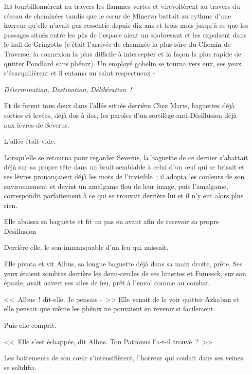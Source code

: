 
\lettrine{I}{ls} tourbillonnèrent au travers les flammes vertes et virevoltèrent au travers du réseau de cheminées tandis que le cœur de Minerva battait au rythme d'une horreur qu'elle n'avait pas ressentie depuis dix ans et trois mois jusqu'à ce que les passages situés entre les plis de l'espace aient un soubresaut et les expulsent dans le hall de Gringotts (c'était l'arrivée de cheminée la plus sûre du Chemin de Traverse, la connexion la plus difficile à intercepter et la façon la plus rapide de quitter Poudlard sans phénix). Un employé gobelin se tourna vers eux, ses yeux s'écarquillèrent et il entama un salut respectueux -

\emph{Détermination, Destination, Délibération~!}

Et ils furent tous deux dans l'allée située derrière Chez Marie, baguettes déjà sorties et levées, déjà dos à dos, les paroles d'un sortilège anti-Désillusion déjà aux lèvres de Severus.

L'allée était vide.

Lorsqu'elle se retourna pour regarder Severus, la baguette de ce dernier s'abattait déjà sur sa propre tête dans un bruit semblable à celui d'un œuf qui se brisait et ses lèvres prononçaient déjà les mots de l'invisible~; il adopta les couleurs de son environnement et devint un amalgame flou de leur image, puis l'amalgame, correspondit parfaitement à ce qui se trouvait derrière lui et il n'y eut alors plus rien.

Elle abaissa sa baguette et fit un pas en avant afin de recevoir sa propre Désillusion -

Derrière elle, le son immanquable d'un feu qui naissait.

Elle pivota et vit Albus, sa longue baguette déjà dans sa main droite, prête. Ses yeux étaient sombres derrière les demi-cercles de ses lunettes et Fumseck, sur son épaule, avait ouvert ses ailes de feu, prêt à l'envol comme au combat.

<<~Albus~! dit-elle. Je pensais -~>> Elle venait de le voir quitter Azkaban et elle pensait que même les phénix ne pouvaient en revenir si facilement.

Puis elle comprit.

<<~Elle s'est échappée, dit Albus. Ton Patronus l'a-t-il trouvé~?~>>

Les battements de son cœur s'intensifièrent, l'horreur qui coulait dans ses veines se solidifia.

